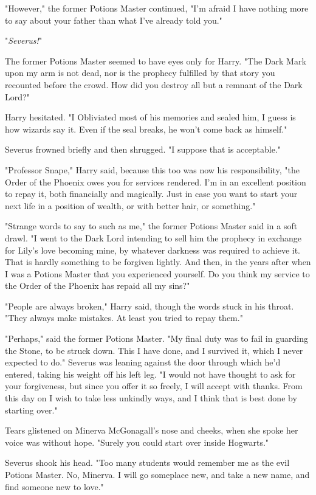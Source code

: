 "However," the former Potions Master continued, "I'm afraid I have nothing more
to say about your father than what I've already told you."

"\emph{Severus!}"

The former Potions Master seemed to have eyes only for Harry. "The Dark Mark
upon my arm is not dead, nor is the prophecy fulfilled by that story you
recounted before the crowd. How did you destroy all but a remnant of the Dark
Lord?"

Harry hesitated. "I Obliviated most of his memories and{\el} sealed him, I
guess is how wizards say it. Even if the seal breaks, he won't come back as
himself."

Severus frowned briefly and then shrugged. "I suppose that is acceptable."

"Professor Snape," Harry said, because this too was now his responsibility,
"the Order of the Phoenix owes you for services rendered. I'm in an excellent
position to repay it, both financially and magically. Just in case you want to
start your next life in a position of wealth, or with better hair, or
something."

"Strange words to say to such as me," the former Potions Master said in a soft
drawl. "I went to the Dark Lord intending to sell him the prophecy in exchange
for Lily's love becoming mine, by whatever darkness was required to achieve it.
That is hardly something to be forgiven lightly. And then, in the years after
when I was a Potions Master{\el} that you experienced yourself. Do you think
my service to the Order of the Phoenix has repaid all my sins?"

"People are always broken," Harry said, though the words stuck in his throat.
"They always make mistakes. At least you tried to repay them."

"Perhaps," said the former Potions Master. "My final duty was to fail in
guarding the Stone, to be struck down. This I have done, and I survived it,
which I never expected to do." Severus was leaning against the door through
which he'd entered, taking his weight off his left leg. "I would not have
thought to ask for your forgiveness, but since you offer it so freely, I will
accept with thanks. From this day on I wish to take less unkindly ways, and I
think that is best done by starting over."

Tears glistened on Minerva McGonagall's nose and cheeks, when she spoke her
voice was without hope. "Surely you could start over inside Hogwarts."

Severus shook his head. "Too many students would remember me as the evil
Potions Master. No, Minerva. I will go someplace new, and take a new name, and
find someone new to love."

